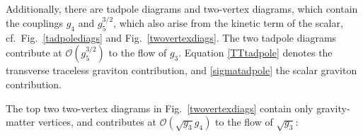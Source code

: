 \documentclass[11pt]{book} %
\newcommand{\bea}{\begin{eqnarray}}
\newcommand{\eea}{\end{eqnarray}}
\numberwithin{equation}{chapter}
\begin{document}

Additionally, there are tadpole diagrams and two-vertex diagrams,
which contain the couplings $g_4$ and $g_5^{3/2}$,
which also arise from the kinetic term of the scalar,
cf.~Fig.~\ref{tadpolediags} and Fig.~\ref{twovertexdiags}.
The two tadpole diagrams contribute at $\mathcal{O}(g_5^{3/2})$ to the flow of $g_3$.
Equation \eqref{TTtadpole} denotes the transverse traceless graviton contribution,
and \eqref{sigmatadpole} the scalar graviton contribution.

The top two two-vertex diagrams in Fig.~\ref{twovertexdiags} contain only gravity-matter vertices,
and contributes at $\mathcal{O}(\sqrt{g_3} g_4)$ to the flow of $\sqrt{g_3}$:
\end{document}
